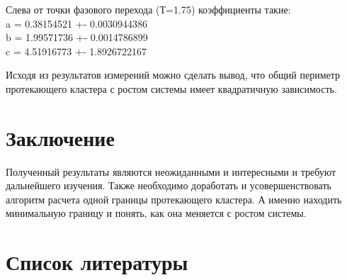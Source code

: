 \documentclass[14pt]{article}
\begin{document}
\par Слева от точки фазового перехода (Т=1.75) коэффициенты такие:\\
a = 0.38154521 +- 0.0030944386\\
b = 1.99571736 +- 0.0014786899\\
c = 4.51916773 +- 1.8926722167\\

\par Исходя из результатов измерений можно сделать вывод, что общий периметр протекающего кластера с ростом системы имеет квадратичную зависимость.

\section{Заключение}
\par Полученный результаты являются неожиданными и интересными и требуют дальнейшего изучения. Также необходимо доработать и усовершенствовать алгоритм расчета одной границы протекающего кластера. А именно находить минимальную границу и понять, как она меняется с ростом системы.\\

\newpage
\section{Список литературы}
\end{document}
